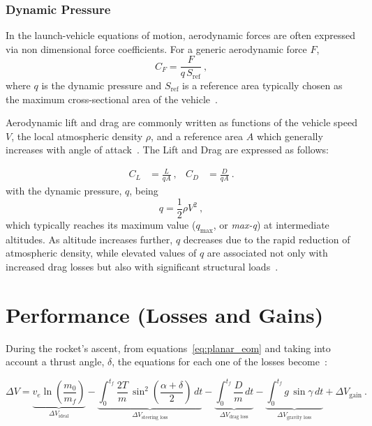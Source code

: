 
\subsubsection{Dynamic Pressure}

In the launch-vehicle equations of motion, aerodynamic forces are often expressed via non dimensional force coefficients. For a generic aerodynamic force $F$,
\begin{equation}
C_F = \frac{F}{q\,S_{\mathrm{ref}}} \ ,
\end{equation}
where $q$ is the dynamic pressure and $S_{\mathrm{ref}}$ is a reference area typically chosen as the maximum cross-sectional area of the vehicle~\cite{Edberg}.

Aerodynamic lift and drag are commonly written as functions of the vehicle speed $V$, the local atmospheric density $\rho$, and a reference area $A$ which generally increases with angle of attack~\cite{Turner}. The Lift and Drag are expressed as follows:

\begin{equation}
\begin{aligned}
C_L &=\frac{L}{qA} \ , &
C_D &=\frac{D}{qA} \ .
\end{aligned}
\label{eq:cd}
\end{equation}
with the dynamic pressure, $q$, being
\begin{equation}
q = \frac{1}{2}\rho V^2 \ ,
\label{eq:q_dyn_press}
\end{equation}
which typically reaches its maximum value ($q_{\max}$, or \emph{max-q}) at intermediate altitudes. As altitude increases further, $q$ decreases due to the rapid reduction of atmospheric density, while elevated values of $q$ are associated not only with increased drag losses but also with significant structural loads~\cite{Ulrich}.


\section{Performance (Losses and Gains)}

During the rocket's ascent, from equations~\ref{eq:planar_eom} and taking into account a thrust angle, $\delta$, the equations for each one of the losses become~\cite{Edberg}:

\begin{equation}
\label{eq:dv_losses}
\Delta V
=
\underbrace{v_e \ln\!\left(\frac{m_0}{m_f}\right)}_{\Delta V_{\text{ideal}}}
-
\underbrace{\int_{0}^{t_f}\frac{2T}{m}\,\sin^2\!\left(\frac{\alpha+\delta}{2}\right)\,dt}_{\Delta V_{\text{steering loss}}}
-
\underbrace{\int_{0}^{t_f}\frac{D}{m}\,dt}_{\Delta V_{\text{drag loss}}}
-
\underbrace{\int_{0}^{t_f} g\,\sin\gamma\,dt}_{\Delta V_{\text{gravity loss}}}
+
\Delta V_{\text{gain}} \ .
\end{equation}


